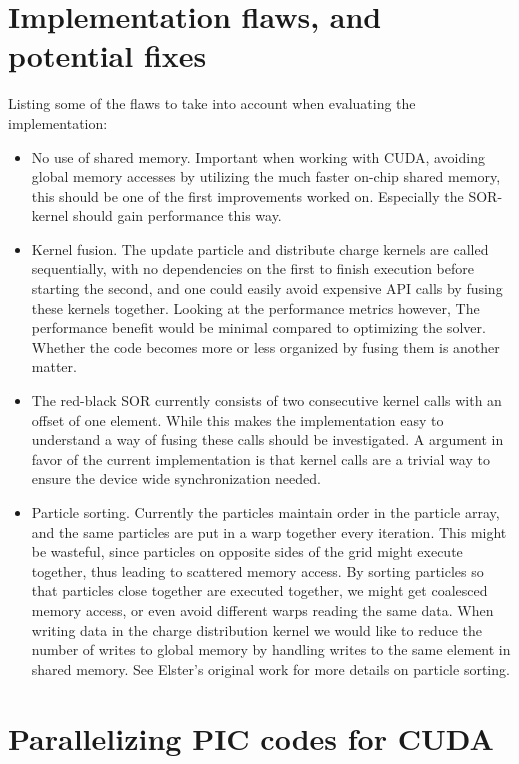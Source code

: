 \section{Implementation flaws, and potential fixes}\label{sec:discussion-flaws}
Listing some of the flaws to take into account when evaluating the implementation:
\begin{itemize}
	\item No use of shared memory. Important when working with CUDA, avoiding global memory accesses by utilizing the much
	faster on-chip shared memory, this should be one of the first improvements worked on. Especially the SOR-kernel should
	gain performance this way.
	\item Kernel fusion. The update particle and distribute charge kernels are called sequentially, with no dependencies on
	the first to finish execution before starting the second, and one could easily avoid expensive API calls by fusing these
	kernels together. Looking at the performance metrics however, The performance benefit would be minimal compared to
	optimizing the solver. Whether the code becomes more or less organized by fusing them is another matter.
	\item The red-black SOR currently consists of two consecutive kernel calls with an offset of one element. While this
	makes the implementation easy to understand a way of fusing these calls should be investigated. A argument in favor of
	the current implementation is that kernel calls are a trivial way to ensure the device wide synchronization needed.
	\item Particle sorting. Currently the particles maintain order in the particle array, and the same particles are put in
	a warp together every iteration. This might be wasteful, since particles on opposite sides of the grid might execute
	together, thus leading to scattered memory access. By sorting particles so that particles close together are executed
	together, we might get coalesced memory access, or even avoid different warps reading the same data. When writing data
	in the charge distribution kernel we would like to reduce the number of writes to global memory by handling writes to
	the same element in shared memory. See Elster's original work\cite[sec.~4.4]{elster94} for more details on particle sorting.

\end{itemize}

\section{Parallelizing PIC codes for CUDA}

